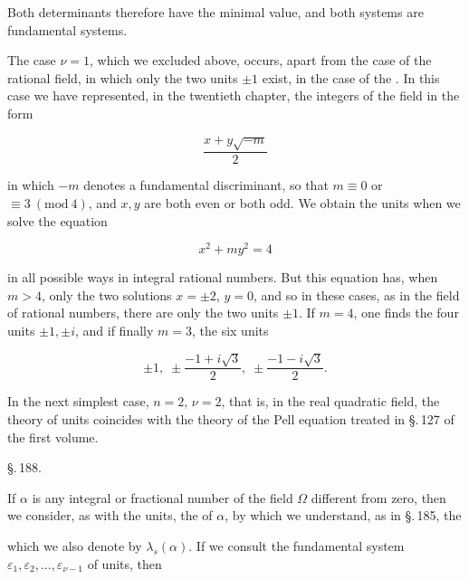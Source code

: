 Both determinants therefore have the minimal value, and
both systems are fundamental systems.

The case $\nu = 1$, which we excluded above, occurs, apart
from the case of the rational field, in which only the two
units $\pm 1$ exist, in the case of the . In this case we have represented, in the twentieth
 chapter, the integers of the field in the form

\[
\frac{x + y\sqrt{-m}}{2}
\]

in which $-m$ denotes a fundamental discriminant, so
that $m \equiv 0$ or $\equiv 3\ (\mathrm{mod}\ 4)$, and $x, y$ are both even or
both odd. We obtain the units when we solve the
equation

\[
x^2 + m y^2 = 4
\]

in all possible ways in integral rational numbers. But this
equation has, when $m > 4$, only the two solutions
$x = \pm 2$, $y = 0$, and so in these cases, as in the
field of rational numbers, there are only the two units $\pm 1$. If
$m = 4$, one finds the four units $\pm 1, \pm i$, and if finally
 $m = 3$, the six units

\[
\pm 1, \; \pm \frac{-1 + i\sqrt{3}}{2}, \; \pm \frac{-1 - i\sqrt{3}}{2}.
\]

In the next simplest case, $n = 2$, $\nu = 2$, that is, in the
real quadratic field, the theory of units coincides
with the theory of the Pell equation treated in \S.\,127 of the
first volume.

\begin{center}
\S.\,188.\\[4pt]
\end{center}

If $\alpha$ is any integral or fractional number of the field $\Omega$
 different from zero, then we consider, as with the
units, the  of $\alpha$,
by which we understand, as in \S.\,185, the 


which we also denote by $\lambda_s(\alpha)$. If we consult the
fundamental system $\varepsilon_1, \varepsilon_2, \ldots, \varepsilon_{\nu-1}$ of units, then
